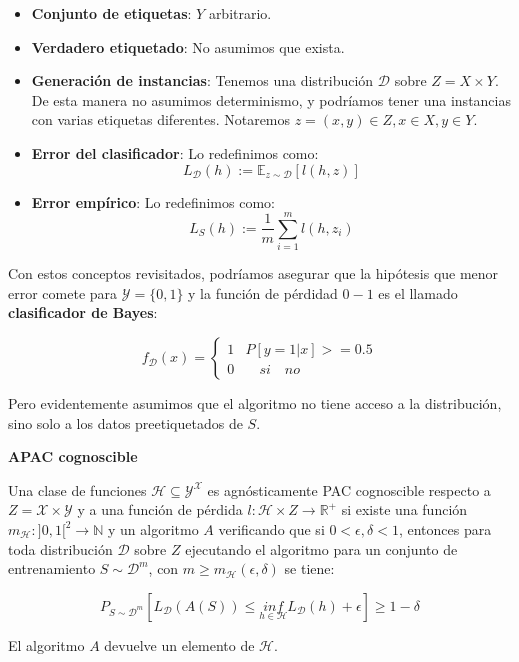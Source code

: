 \begin{itemize}
  \item \textbf{Conjunto de etiquetas}: $Y$ arbitrario.

  \item \textbf{Verdadero etiquetado}: No asumimos que exista.

  \item \textbf{Generación de instancias}: Tenemos una distribución $\mathcal{D}$ sobre $Z = X\times Y$. De esta
  manera no asumimos determinismo, y podríamos tener una instancias con varias etiquetas diferentes. Notaremos
  $z = (x,y) \in Z, x\in X, y\in Y$.

  \item \textbf{Error del clasificador}: Lo redefinimos como:
  \[L_{\mathcal{D}}(h) :=  \mathbb{E}_{z\sim \mathcal{D}}[l(h,z)]\]
  
  \item \textbf{Error empírico}: Lo redefinimos como:
  \[L_{S} (h) := \frac{1}{m} \sum_{i=1}^m l(h,z_i)\]
\end{itemize}

Con estos conceptos revisitados, podríamos asegurar que la hipótesis que menor error comete para 
$\mathcal{Y} = \{0,1\}$ y la función de pérdidad $0-1$ es el llamado \textbf{clasificador de Bayes}:

\[f_{\mathcal{D}}(x) = \left\{\begin{array}{ll}
1 & P [y = 1 |x] >= 0.5\\
0 & \quad si \quad no
\end{array}\right.\]

Pero evidentemente asumimos que el algoritmo no tiene acceso a la distribución, sino solo a los datos 
preetiquetados de $S$.


\begin{definition*} \textbf{APAC cognoscible}

Una clase de funciones $\mathcal{H} \subseteq \mathcal{Y}^{\mathcal{X}}$ es agnósticamente 
PAC cognoscible respecto a $Z = \mathcal{X} \times \mathcal{Y}$ y a una función de pérdida 
$l: \mathcal{H} \times Z \rightarrow \mathbb{R}^{+}$ si existe una función 
$m_{\mathcal{H}} : ]0,1[^2\rightarrow \mathbb{N}$ y un algoritmo $A$ verificando que si 
$0 < \epsilon, \delta < 1$, entonces para toda distribución $\mathcal{D}$ sobre $Z$ ejecutando el 
algoritmo para un conjunto de entrenamiento $S\sim \mathcal{D}^m$, con 
$m\ge m_{\mathcal{H}}(\epsilon, \delta)$ se tiene:

\[P_{S\sim \mathcal{D}^m}[L_{\mathcal{D}}(A(S)) \le \underset{h\in \mathcal{H}}{inf} L_{\mathcal{D}}(h) + \epsilon] \ge 1-\delta\]

El algoritmo $A$ devuelve un elemento de $\mathcal{H}$.
\end{definition*}

